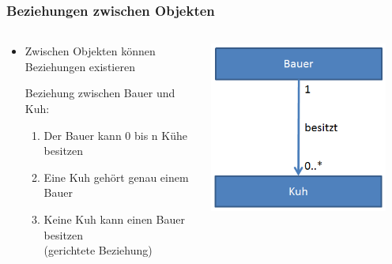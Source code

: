 \begin{frame}
\frametitle{Beziehungen zwischen Objekten}
\begin{columns}
	    \begin{column}{.6\textwidth}
			\small
			\begin{itemize}
			  \item Zwischen Objekten k\"onnen Beziehungen existieren
			  \begin{item}
			  		Beziehung zwischen Bauer und Kuh:
					\begin{enumerate}
					  \item \tiny Der Bauer kann 0 bis n K\"uhe besitzen
					  \item \tiny Eine Kuh geh\"ort genau einem Bauer
					  \item \tiny Keine Kuh kann einen Bauer besitzen \\ (gerichtete Beziehung)
					\end{enumerate}
			  \end{item} 
			\end{itemize}
			\normalsize
	    \end{column}
	    \begin{column}{.4\textwidth}
	   		\center
			\includegraphics[width=0.9\textwidth,
			keepaspectratio=true]{bilder/asso_kuh.png}
	    \end{column}
	\end{columns} 
\end{frame}


